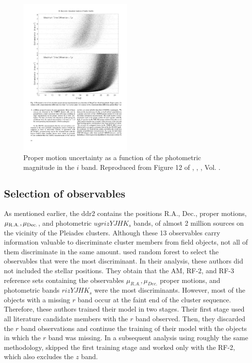 \begin{figure}[ht!]
\begin{center}
\includegraphics[height=8cm]{background/Figures/F12_Bouy2013.pdf}
\caption{Proper motion uncertainty as a function of the photometric magnitude in the $i$ band. Reproduced from Figure 12 of \citet{Bouy2013}, \textit{}, , Vol. .}
\label{fig:pmuncert}
\end{center}
\end{figure}

\subsection{Selection of observables}
\label{sect:RF-2}
\sloppy
As mentioned earlier, the \gls{ddr2} contains the positions R.A., Dec., proper motions, $\mu_{\rm{R.A.}},\mu_{\rm{Dec.}}$, and photometric $ugrizYJHK_s$ bands, of almost 2 million sources on the vicinity of the Pleiades clusters. Although these 13 observables carry information valuable to discriminate cluster members from field objects, not all of them discriminate in the same amount. \citet{Sarro2014} used random forest to select the observables that were the most discriminant. In their analysis, these authors did not included the stellar positions. They obtain that the AM, RF-2, and RF-3 reference sets containing the observables $\mu_{R.A.},\mu_{Dec.}$ proper motions, and photometric bands $rizYJHK_s$ were the most discriminants. {However, most of the objects with a missing $r$ band occur at the faint end of the cluster sequence. Therefore, these authors trained their model in two stages. Their first stage used all literature candidate members with the $r$ band observed. Then, they discarded the $r$ band observations and continue the training of their model with the objects in which the $r$ band was missing.} In a subsequent analysis using roughly the same methodology, \citet{Bouy2015} skipped the first training stage and worked only with the RF-2, which also excludes the $z$ band.

